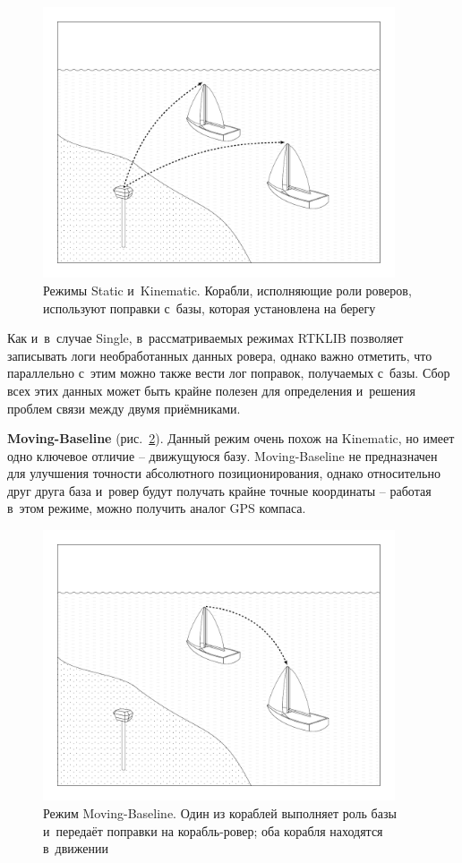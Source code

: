 \begin{dashitemize}
  \begin{figure}[h!]
    \centering
    \setlength{\fboxsep}{5pt}
    \includegraphics[height=8cm]{img/tikz/rtk-static-kinematic/pic}
    \caption{Режимы Static и~Kinematic. Корабли, исполняющие роли роверов, используют поправки с~базы, которая установлена на берегу}\label{fig:rtk-static-kinematic}
  \end{figure}
  
  Как и~в~случае Single, в~рассматриваемых режимах RTKLIB позволяет записывать логи необработанных данных ровера, однако важно отметить, что параллельно с~этим можно также вести лог поправок, получаемых с~базы. Сбор всех этих данных может быть крайне полезен для определения и~решения проблем связи между двумя приёмниками.
  
  \item \textbf{Moving-Baseline} (рис.~\ref{fig:rtk-moving-baseline}). Данный режим очень похож на Kinematic, но имеет одно ключевое отличие -- движущуюся базу. Moving-Baseline не предназначен для улучшения точности абсолютного позиционирования, однако относительно друг друга база и~ровер будут получать крайне точные координаты -- работая в~этом режиме, можно получить аналог GPS компаса.
  
  \begin{figure}[h!]
    \centering
    \setlength{\fboxsep}{5pt}
    \includegraphics[height=8cm]{img/tikz/rtk-moving-baseline/pic}
    \caption{Режим Moving-Baseline. Один из кораблей выполняет роль базы и~передаёт поправки на корабль-ровер; оба корабля находятся в~движении}\label{fig:rtk-moving-baseline}
  \end{figure}
  

\end{dashitemize}
